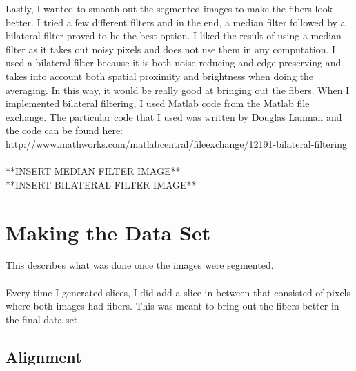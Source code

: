 \documentclass[11pt,psfig]{article}
\begin{document}
Lastly, I wanted to smooth out the segmented images to make the fibers look better. I tried a few different filters and in the end, a median filter followed by a bilateral filter proved to be the best option. I liked the result of using a median filter as it takes out noisy pixels and does not use them in any computation. I used a bilateral filter because it is both noise reducing and edge preserving and takes into account both spatial proximity and brightness when doing the averaging. In this way, it would be really good at bringing out the fibers. When I implemented bilateral filtering, I used Matlab code from the Matlab file exchange. The particular code that I used was written by Douglas Lanman and the code can be found here: http://www.mathworks.com/matlabcentral/fileexchange/12191-bilateral-filtering \\
\\
**INSERT MEDIAN FILTER IMAGE**
\\
**INSERT BILATERAL FILTER IMAGE**

\section{Making the Data Set}

This describes what was done once the images were segmented. \\
\\
Every time I generated slices, I did add a slice in between that consisted of pixels where both images had fibers. This was meant to bring out the fibers better in the final data set. 

\subsection{Alignment}
\end{document}

